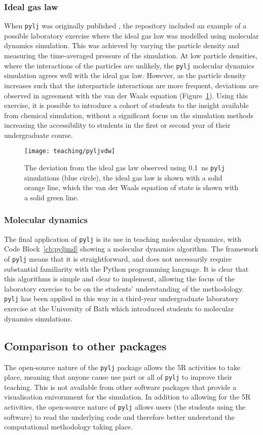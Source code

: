 \subsubsection{Ideal gas law}
When \texttt{pylj} was originally published \cite{mccluskey_pylj_2018}, the repository included an example of a possible laboratory exercise where the ideal gas law was modelled using molecular dynamics simulation.
This was achieved by varying the particle density and measuring the time-averaged pressure of the simulation.
At low particle densities, where the interactions of the particles are unlikely, the \texttt{pylj} molecular dynamics simulation agrees well with the ideal gas law.
However, as the particle density increases such that the interparticle interactions are more frequent, deviations are observed in agreement with the van der Waals equation (Figure~\ref{fig:vdw}).
Using this exercise, it is possible to introduce a cohort of students to the insight available from chemical simulation, without a significant focus on the simulation methods increasing the accessibility to students in the first or second year of their undergraduate course.
%
\begin{figure}
    \centering
    \texttt{[image: teaching/pyljvdw]}
    \caption{The deviation from the ideal gas law observed using \SI{0.1}{\nano\second} \texttt{pylj} simulations (blue circle), the ideal gas law is shown with a solid orange line, which the van der Waals equation of state is shown with a solid green line.}
    \label{fig:vdw}
\end{figure}
%

\subsubsection{Molecular dynamics}
The final application of \texttt{pylj} is its use in teaching molecular dynamics, with Code Block~\ref{cb:pyljmd} showing a molecular dynamics algorithm.
The framework of \texttt{pylj} means that it is straightforward, and does not necessarily require substantial familiarity with the Python programming language.
It is clear that this algorithms is simple and clear to implement, allowing the focus of the laboratory exercise to be on the students' understanding of the methodology.
\texttt{pylj} has been applied in this way in a third-year undergraduate laboratory exercise at the University of Bath which introduced students to molecular dynamics simulations.

\subsection{Comparison to other packages}
The open-source nature of the \texttt{pylj} package allows the 5R activities to take place, meaning that anyone cause use part or all of \texttt{pylj} to improve their teaching.
This is not available from other software packages that provide a visualisation enivornment for the simulation.
In addition to allowing for the 5R activities, the open-source nature of \texttt{pylj} allows users (the students using the software) to read the underlying code and therefore better understand the computational methodology taking place. 

